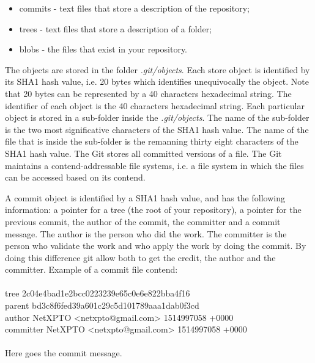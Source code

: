 \begin{itemize}
    \item[\textbullet] {commits - text files that store a description of the repository;}
    \item[\textbullet] {trees - text files that store a description of a folder;}
    \item[\textbullet] {blobs - the files that exist in your repository.}
\end{itemize}
%
\noindent The objects are stored in the folder \emph{.git/objects}. Each store object is identified by its SHA1 hash value, i.e. 20 bytes which identifies unequivocally the object. Note that 20 bytes can be represented by a 40 characters hexadecimal string. The identifier of each object is the 40 characters hexadecimal string. Each particular object is stored in a sub-folder inside the \emph{.git/objects}. The name of the sub-folder is the two most significative characters of the SHA1 hash value. The name of the file that is inside the sub-folder is the remanning thirty eight characters of the SHA1 hash value. The Git stores all committed versions of a file. The Git maintains a contend-addressable file systems, i.e. a file system in which the files can be accessed based on its contend.

A commit object is identified by a SHA1 hash value, and has the following information: a pointer for a tree (the root of your repository), a pointer for the previous commit, the author of the commit, the committer and a commit message.
The author is the person who did the work. The committer is the person who validate the work and who apply the work by doing the commit. By doing this difference git allow both to get the credit, the author and the committer. Example of a commit file contend:\\
\\
tree 2c04e4bad1e2bcc0223239e65c0e6e822bba4f16\\
parent bd3c8f6fed39a601c29c5d101789aaa1dab0f3cd\\
author NetXPTO <netxpto@gmail.com> 1514997058 +0000\\
committer NetXPTO <netxpto@gmail.com> 1514997058 +0000\\
\\
Here goes the commit message.\\

